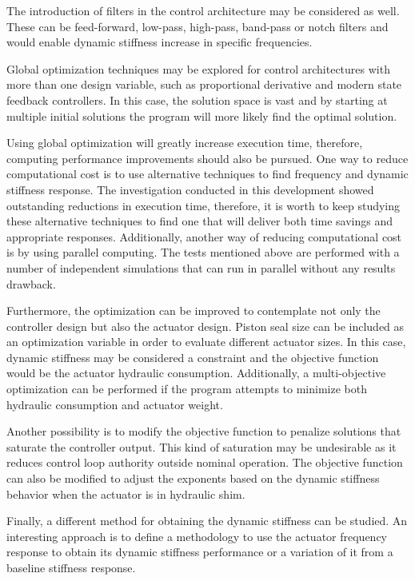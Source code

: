 The introduction of filters in the control architecture may be considered as well. These can be feed-forward, low-pass, high-pass, band-pass or notch filters and would enable dynamic stiffness increase in specific frequencies.

Global optimization techniques may be explored for control architectures with more than one design variable, such as proportional derivative and modern state feedback controllers. In this case, the solution space is vast and by starting at multiple initial solutions the program will more likely find the optimal solution.

Using global optimization will greatly increase execution time, therefore, computing performance improvements should also be pursued. One way to reduce computational cost is to use alternative techniques to find frequency and dynamic stiffness response. The investigation conducted in this development showed outstanding reductions in execution time, therefore, it is worth to keep studying these alternative techniques to find one that will deliver both time savings and appropriate responses. Additionally, another way of reducing computational cost is by using parallel computing. The tests mentioned above are performed with a number of independent simulations that can run in parallel without any results drawback. 

Furthermore, the optimization can be improved to contemplate not only the controller design but also the actuator design. Piston seal size can be included as an optimization variable in order to evaluate different actuator sizes. In this case, dynamic stiffness may be considered a constraint and the objective function would be the actuator hydraulic consumption. Additionally, a multi-objective optimization can be performed if the program attempts to minimize both hydraulic consumption and actuator weight.

Another possibility is to modify the objective function to penalize solutions that saturate the controller output. This kind of saturation may be undesirable as it reduces control loop authority outside nominal operation. The objective function can also be modified to adjust the exponents based on the dynamic stiffness behavior when the actuator is in hydraulic shim.  

Finally, a different method for obtaining the dynamic stiffness can be studied. An interesting approach is to define a methodology to use the actuator frequency response to obtain its dynamic stiffness performance or a variation of it from a baseline stiffness response.
